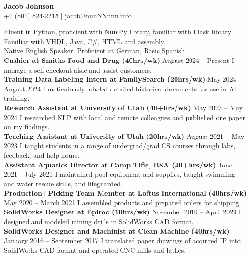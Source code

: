 \documentclass[a4paper,10pt]{article}
\newcommand{\resumeSection}[1]{\vspace{2pt}\noindent{\Large \textbf{#1}}\vspace{1pt}\newline}
\newcommand{\resumeSubsection}[2]{\noindent\textbf{#1} \hfill #2\newline}
\begin{document}
\begin{center}
    {\LARGE \textbf{Jacob Johnson}} \\
    \vspace{2pt}
    +1 (801) 824-2215  | jacob@nnnNNnnn.info
\end{center}

\resumeSection{Overview}
    Fluent in Python, proficient with NumPy library, familiar with Flask library \\
    Familiar with VHDL, Java, C\#, HTML and assembly \\
    Native English Speaker, Proficient at German, Basic Spanish \\

\resumeSection{Work Experience}
    \resumeSubsection{Cashier at Smiths Food and Drug (40hrs/wk)}{August 2024 -- Present}
        I manage a self checkout aisle and assist customers. \\
    \resumeSubsection{Training Data Labeling Intern at FamilySearch (20hrs/wk)}{May 2024 -- August 2024}
        I meticulously labeled detailed historical documents for use in AI training. \\
    \resumeSubsection{Research Assistant at University of Utah (40+hrs/wk)}{May 2023 -- May 2024}
        I researched NLP with local and remote colleagues and published one paper on my findings. \\
    \resumeSubsection{Teaching Assistant at University of Utah (20hrs/wk)}{August 2021 -- May 2023}
        I taught students in a range of undergrad/grad CS courses through labs, feedback, and help hours. \\
    \resumeSubsection{Assistant Aquatics Director at Camp Tifie, BSA (40+hrs/wk)}{June 2021 - July 2021}
        I maintained pool equipment and supplies, taught swimming and water rescue skills, and lifeguarded. \\
    \resumeSubsection{Production+Picking Team Member at Loftus International (40hrs/wk)}{May 2020 -- March 2021}
        I assembled products and prepared orders for shipping. \\
    \resumeSubsection{SolidWorks Designer at Epiroc (10hrs/wk)}{November 2019 -- April 2020}    
        I designed and modeled mining drills in SolidWorks CAD format. \\
    \resumeSubsection{SolidWorks Designer and Machinist at Clean Machine (40hrs/wk)}{January 2016 -- September 2017}
        I translated paper drawings of acquired IP into SolidWorks CAD format and operated CNC mills and lathes. \\
\end{document}
